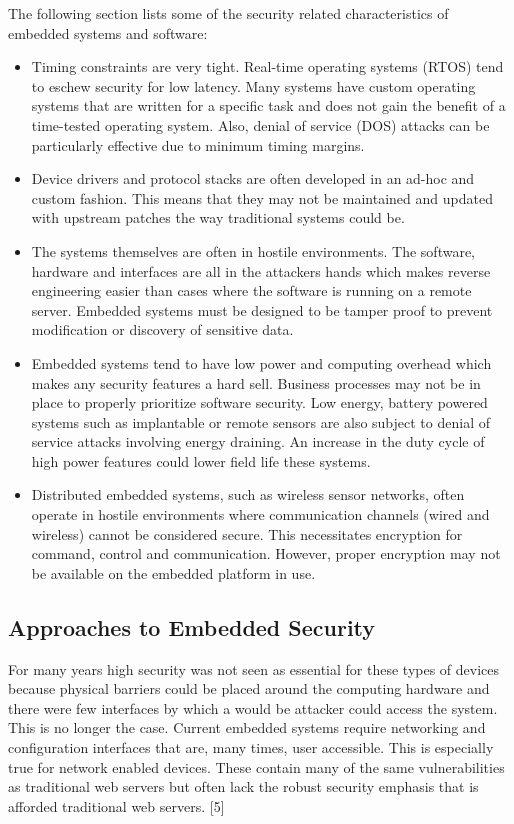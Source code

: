 \documentclass[final,conference,10pt]{IEEEtran}
\begin{document}
The following section lists some of the security related characteristics of embedded systems and software:

\begin{itemize}
\item 
Timing constraints are very tight.  Real-time operating systems (RTOS) tend to eschew security for low latency.  Many systems have custom operating systems that are written for a specific task and does not gain the benefit of a time-tested operating system.  Also, denial of service (DOS) attacks can be particularly effective due to minimum timing margins. \cite{Catal2011}
\item
Device drivers and protocol stacks are often developed in an ad-hoc and custom fashion.  This means that they may not be maintained and updated with upstream patches the way traditional systems could be.
\item 
The systems themselves are often in hostile environments. The software, hardware and interfaces are all in the attackers hands which makes reverse engineering easier than cases where the software is running on a remote server.  Embedded systems must be designed to be tamper proof to prevent modification or discovery of sensitive data.
\item 
Embedded systems tend to have low power and computing overhead which makes any security features a hard sell. Business processes may not be in place to properly prioritize software security.
Low energy, battery powered systems such as implantable or remote sensors are also subject to denial of service attacks involving energy draining.  An increase in the duty cycle of high power features could lower field life these systems. \cite{Catal2011}
\item 
Distributed embedded systems, such as wireless sensor networks, often operate in hostile environments where communication channels (wired and wireless) cannot be considered secure.  This necessitates encryption for command, control and communication. However, proper encryption may not be available on the embedded platform in use. \cite{Catal2011}
\end{itemize}

\subsection{Approaches to Embedded Security}

For many years high security was not seen as essential for these types of devices because physical barriers could be placed around the computing hardware and there were few interfaces by which a would be attacker could access the system.  This is no longer the case.  Current embedded systems require networking and configuration interfaces that are, many times, user accessible.  This is especially true for network enabled devices.  These contain many of the same vulnerabilities as traditional web servers but often lack the robust security emphasis that is afforded traditional web servers. [5]
\end{document}
